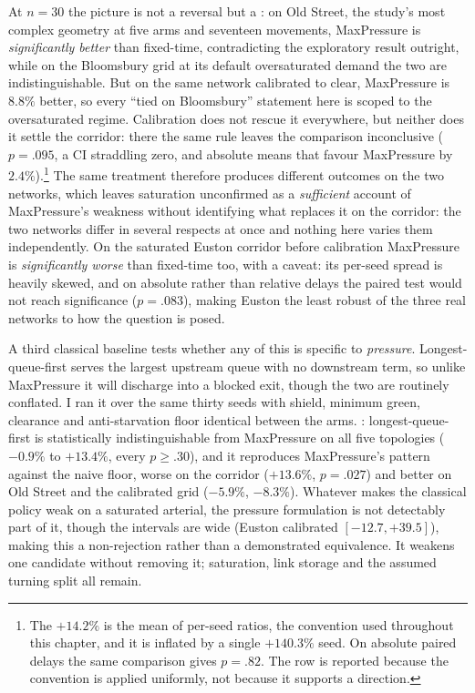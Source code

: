 At $n{=}30$ the picture is not a reversal but a : on Old Street, the study's most complex geometry at five
arms and seventeen movements, MaxPressure is \emph{significantly better}
than fixed-time, contradicting the exploratory result outright, while on
the Bloomsbury grid at its default oversaturated demand the two are
indistinguishable. But on the same network calibrated to clear,
MaxPressure is $8.8\%$ better, so every ``tied on Bloomsbury'' statement
here is scoped to the oversaturated regime. Calibration does not rescue it
everywhere, but neither does it settle the corridor: there the same rule
leaves the comparison inconclusive ($p{=}.095$, a CI straddling zero, and
absolute means that favour MaxPressure by $2.4\%$).\footnote{The
$+14.2\%$ is the mean of per-seed ratios, the convention used throughout
this chapter, and it is inflated by a single $+140.3\%$ seed. On absolute
paired delays the same comparison gives $p{=}.82$. The row is reported
because the convention is applied uniformly, not because it supports a
direction.} The same treatment therefore produces different
outcomes on the two networks, which leaves saturation unconfirmed as a
\emph{sufficient} account of MaxPressure's weakness without identifying
what replaces it on the corridor: the two networks differ in
several respects at once and nothing here varies them independently. On the
saturated Euston corridor before calibration MaxPressure is
\emph{significantly worse} than fixed-time too, with a caveat: its
per-seed spread is heavily skewed, and on absolute rather than relative
delays the paired test would not reach significance ($p{=}.083$), making
Euston the least robust of the three real networks to how the question is
posed.

A third classical baseline tests whether any of this is specific to
\emph{pressure}. Longest-queue-first serves the largest upstream queue with no
downstream term, so unlike MaxPressure it will discharge into a blocked
exit, though the two are routinely conflated. I ran it over the same thirty seeds with shield,
minimum green, clearance and anti-starvation floor identical between the
arms. : longest-queue-first is
statistically indistinguishable from MaxPressure on all five topologies
($-0.9\%$ to $+13.4\%$, every $p\ge.30$), and it reproduces MaxPressure's pattern
against the naive floor, worse on the corridor ($+13.6\%$, $p{=}.027$) and better
on Old Street and the calibrated grid ($-5.9\%$, $-8.3\%$). Whatever makes the
classical policy weak on a saturated arterial, the pressure formulation is not
detectably part of it, though the intervals are wide (Euston calibrated
$[-12.7, +39.5]$), making this a non-rejection rather than a demonstrated
equivalence. It weakens one candidate without removing it; saturation,
link storage and the assumed turning split all remain.

